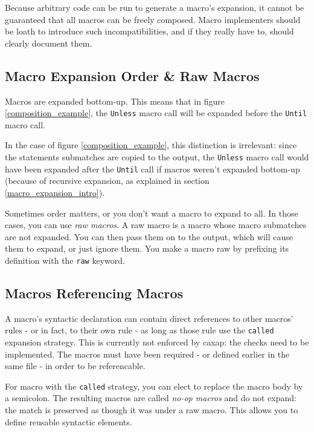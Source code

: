 Because arbitrary code can be run to generate a macro's expansion, it cannot be
guaranteed that all macros can be freely composed. Macro implementers should be
loath to introduce such incompatibilities, and if they really have to, should
clearly document them.

\subsection{Macro Expansion Order \& Raw Macros}
\label{raw_macros}

Macros are expanded bottom-up. This means that in figure
\ref{composition_example}, the \texttt{Unless} macro call will be expanded
before the \texttt{Until} macro call.

In the case of figure \ref{composition_example}, this distinction is irrelevant:
since the statements submatches are copied to the output, the \texttt{Unless}
macro call would have been expanded after the \texttt{Until} call if macros
weren't expanded bottom-up (because of recursive expansion, as explained in
section \ref{macro_expansion_intro}).

Sometimes order matters, or you don't want a macro to expand to all.  In those
cases, you can use \emph{raw macros}. A raw macro is a macro whose macro
submatches are not expanded. You can then pass them on to the output, which will
cause them to expand, or just ignore them. You make a macro raw by prefixing its
definition with the \texttt{raw} keyword.

\subsection{Macros Referencing Macros}
\label{noop_macros}

A macro's syntactic declaration can contain direct references to other macros'
rules - or in fact, to their own rule - as long as those rule use the
\texttt{called} expansion strategy. This is currently not enforced by caxap: the
checks need to be implemented. The macros must have been required - or defined
earlier in the same file - in order to be referencable.

For macro with the \texttt{called} strategy, you can elect to replace the macro
body by a semicolon. The resulting macros are called \emph{no-op macros} and do
not expand: the match is preserved as though it was under a raw macro. This
allows you to define reusable syntactic elements.

